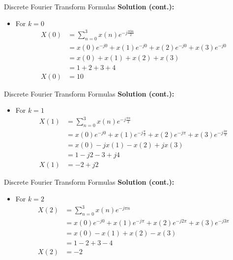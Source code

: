 \documentclass[pdflatex,compress,mathserif]{beamer}
\begin{document}
\begin{frame}[fragile]{Discrete Fourier Transform Formulas}
    \textbf{Solution (cont.):}
    \begin{itemize}
        \item For $k = 0$
        \begin{align*}
            X(0) &= \sum_{n=0}^{3} x(n)e^{-j\frac{\pi 0n}{2}} \\
            &= x(0)e^{-j0} + x(1)e^{-j0} + x(2)e^{-j0} + x(3)e^{-j0} \\
            &= x(0) + x(1) + x(2) + x(3) \\
            &= 1 + 2 + 3 + 4 \\
            X(0) &= 10
        \end{align*}
    \end{itemize}
\end{frame}

\begin{frame}[fragile]{Discrete Fourier Transform Formulas}
    \textbf{Solution (cont.):}
    \begin{itemize}
        \item For $k = 1$
        \begin{align*}
            X(1) &= \sum_{n=0}^{3} x(n)e^{-j\frac{\pi n}{2}} \\
            &= x(0)e^{-j0} + x(1)e^{-j\frac{\pi}{2}} + x(2)e^{-j \pi} + x(3)e^{-j\frac{3\pi}{2}} \\
            &= x(0) - jx(1) - x(2) + jx(3) \\
            &= 1 - j2 - 3 + j4 \\
            X(1) &= -2 + j2
        \end{align*}
    \end{itemize}
\end{frame}

\begin{frame}[fragile]{Discrete Fourier Transform Formulas}
    \textbf{Solution (cont.):}
    \begin{itemize}
        \item For $k = 2$
        \begin{align*}
            X(2) &= \sum_{n=0}^{3} x(n)e^{-j \pi n} \\
            &= x(0)e^{-j0} + x(1)e^{-j\pi} + x(2)e^{-j2\pi} + x(3)e^{-j3\pi} \\
            &= x(0) - x(1) + x(2) - x(3) \\
            &= 1 - 2 + 3 - 4 \\
            X(2) &= -2
        \end{align*}
    \end{itemize}
\end{frame}
\end{document}
